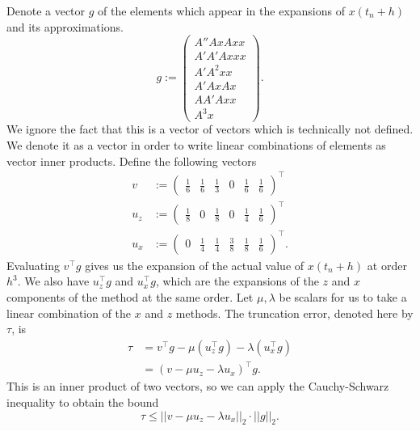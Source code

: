 Denote a vector $g$ of the elements which appear in the expansions of $x(t_n+h)$ and its approximations.
\begin{equation*}
    g := \begin{pmatrix}
        A'' Ax Ax x \\
        A' A' A xxx \\
        A' A^2 xx \\
        A' Ax Ax \\
        A A' A xx \\
        A^3 x
    \end{pmatrix}.
\end{equation*}
We ignore the fact that this is a vector of vectors which is technically not defined.
We denote it as a vector in order to write linear combinations of elements as vector inner products. %
Define the following vectors
\begin{align*}
    v &:= \begin{pmatrix}
        \frac{1}{6} & \frac{1}{6} & \frac{1}{3} & 0 & \frac{1}{6} & \frac{1}{6}
    \end{pmatrix}^\top \\
    u_z &:= \begin{pmatrix}
        \frac{1}{8} & 0 & \frac{1}{8} & 0 & \frac{1}{4} & \frac{1}{6}
    \end{pmatrix}^\top \\
    u_x &:= \begin{pmatrix}
        0 & \frac{1}{4} & \frac{1}{4} & \frac{3}{8} & \frac{1}{8} & \frac{1}{6}
    \end{pmatrix}^\top .
\end{align*}
Evaluating $v^\top g$ gives us the expansion of the actual value of $x(t_n+h)$ at order $h^3$.
We also have $u_z^\top g$ and $u_x^\top g$, which are the expansions of the $z$ and $x$ components of the method at the same order.
Let $\mu, \lambda$ be scalars for us to take a linear combination of the $x$ and $z$ methods.
The truncation error, denoted here by $\tau$, is
\begin{align*}
    \tau &= v^\top g - \mu ( u_z^\top g ) - \lambda ( u_x^\top g ) \\
    &= \left( v - \mu u_z - \lambda u_x \right)^\top g.
\end{align*}
This is an inner product of two vectors, so we can apply the Cauchy-Schwarz inequality to obtain the bound
\begin{equation*}
    \tau \leq ||v - \mu u_z - \lambda u_x||_2 \cdot ||g||_2.
\end{equation*}
